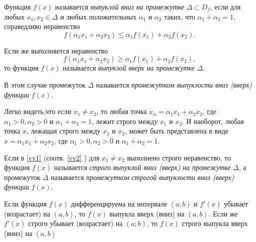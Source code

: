 \begin{defn}
Функция $f(x)$ называется \textit{выпуклой вниз на промежутке} $\Delta\subset D_f$, если для любых $x_1,x_2\in\Delta$ и любых положительных $\alpha_1$ и $\alpha_2$ таких, что $\alpha_1+\alpha_2=1$, справедливо неравенство
\begin{equation} \label{vv1}
f(\alpha_1x_1+\alpha_2x_2) \leq \alpha_1f(x_1)+\alpha_2f(x_2).
\end{equation}

Если же выполняется неравенство
\begin{equation} \label{vv2}
f(\alpha_1x_1+\alpha_2x_2) \geq \alpha_1f(x_1)+\alpha_2f(x_2),
\end{equation}
то функция $f(x)$ называется \textit{выпуклой вверх на промежутке} $\Delta$.

В этом случае промежуток $\Delta$ называется \textit{промежутком выпуклости вниз (вверх) функции} $f(x)$.
\end{defn}

Легко видеть,что если $x_1\neq x_2$, то любая точка $x_\alpha=\alpha_1x_1+\alpha_2x_2$, где $\alpha_1>0,\alpha_2>0$ и $\alpha_1+\alpha_2=1$, лежит строго между $x_1$ и $x_2$. И наоборот, любая точка $x$, лежащая строго между $x_1$ и $x_2$, может быть представлена в виде $x=\alpha_1x_1+\alpha_2x_2$, где $\alpha_1>0,\alpha_2>0$ и $\alpha_1+\alpha_2=1$.

Если в \eqref{vv1} (соотв. \eqref{vv2} ) для $x_1\neq x_2$ выполнено строго неравенство, то функция $f(x)$ называется \textit{строго выпуклой вниз (вверх) на промежутке} $\Delta$, а промежуток $\Delta$ называется \textit{промежутком строгой выпуклости вниз (вверх) функции} $f(x)$.

\begin{thm}
Если функция $f(x)$ дифференцируема на интервале $(a;b)$ и $f'(x)$ убывает (возрастает) на $(a,b)$, то $f(x)$ выпукла вверх (вниз) на $(a,b)$. Если же $f'(x)$ строго убывает (возрастает) на $(a;b)$, то $f(x)$ строго выпукла вверх (вниз) на $(a,b)$
\end{thm}

